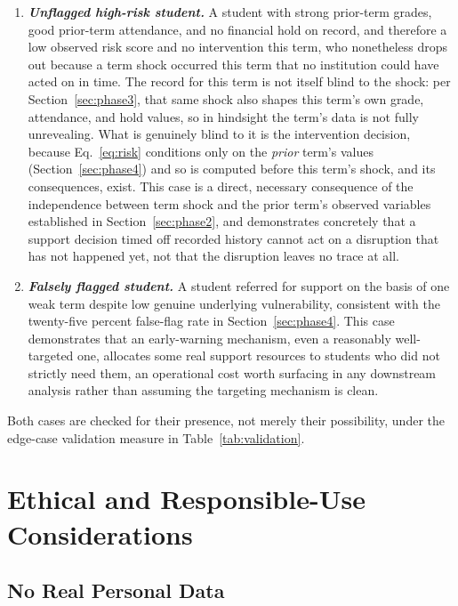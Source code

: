 \documentclass[11pt]{article}
\begin{document}
\begin{enumerate}[topsep=2pt,itemsep=3pt,parsep=0pt]
\item \textbf{\textit{Unflagged high-risk student.}} A student with strong prior-term grades, good prior-term attendance, and no financial hold on record, and therefore a low observed risk score and no intervention this term, who nonetheless drops out because a term shock occurred this term that no institution could have acted on in time. The record for this term is not itself blind to the shock: per Section~\ref{sec:phase3}, that same shock also shapes this term's own grade, attendance, and hold values, so in hindsight the term's data is not fully unrevealing. What is genuinely blind to it is the intervention decision, because Eq.~\ref{eq:risk} conditions only on the \emph{prior} term's values (Section~\ref{sec:phase4}) and so is computed before this term's shock, and its consequences, exist. This case is a direct, necessary consequence of the independence between term shock and the prior term's observed variables established in Section~\ref{sec:phase2}, and demonstrates concretely that a support decision timed off recorded history cannot act on a disruption that has not happened yet, not that the disruption leaves no trace at all.
\item \textbf{\textit{Falsely flagged student.}} A student referred for support on the basis of one weak term despite low genuine underlying vulnerability, consistent with the twenty-five percent false-flag rate in Section~\ref{sec:phase4}. This case demonstrates that an early-warning mechanism, even a reasonably well-targeted one, allocates some real support resources to students who did not strictly need them, an operational cost worth surfacing in any downstream analysis rather than assuming the targeting mechanism is clean.
\end{enumerate}

Both cases are checked for their presence, not merely their possibility, under the edge-case validation measure in Table~\ref{tab:validation}.


\FloatBarrier
\section{Ethical and Responsible-Use Considerations}
\label{sec:ethics}

\subsection{No Real Personal Data}
\label{sec:ethics-A}
\end{document}
